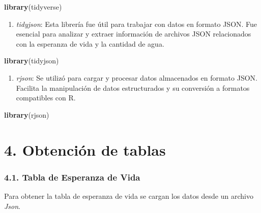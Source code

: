 \documentclass[
]{article}
\newenvironment{Shaded}{\begin{snugshade}}{\end{snugshade}}
\newcommand{\FunctionTok}[1]{\textcolor[rgb]{0.13,0.29,0.53}{\textbf{#1}}}
\newcommand{\NormalTok}[1]{#1}
\providecommand{\tightlist}{%
  \setlength{\itemsep}{0pt}\setlength{\parskip}{0pt}}
\begin{document}
\begin{Shaded}
\begin{Highlighting}[]
\FunctionTok{library}\NormalTok{(tidyverse)}
\end{Highlighting}
\end{Shaded}

\begin{enumerate}
\def\labelenumi{\arabic{enumi}.}
\setcounter{enumi}{2}
\tightlist
\item
  \emph{tidyjson}: Esta librería fue útil para trabajar con datos en
  formato JSON. Fue esencial para analizar y extraer información de
  archivos JSON relacionados con la esperanza de vida y la cantidad de
  agua.
\end{enumerate}

\begin{Shaded}
\begin{Highlighting}[]
\FunctionTok{library}\NormalTok{(tidyjson)}
\end{Highlighting}
\end{Shaded}

\begin{enumerate}
\def\labelenumi{\arabic{enumi}.}
\setcounter{enumi}{3}
\tightlist
\item
  \emph{rjson}: Se utilizó para cargar y procesar datos almacenados en
  formato JSON. Facilita la manipulación de datos estructurados y su
  conversión a formatos compatibles con R.
\end{enumerate}

\begin{Shaded}
\begin{Highlighting}[]
\FunctionTok{library}\NormalTok{(rjson) }
\end{Highlighting}
\end{Shaded}

\hypertarget{obtenciuxf3n-de-tablas}{%
\section{4. Obtención de tablas}\label{obtenciuxf3n-de-tablas}}

\hypertarget{tabla-de-esperanza-de-vida}{%
\subsubsection{4.1. Tabla de Esperanza de
Vida}\label{tabla-de-esperanza-de-vida}}

Para obtener la tabla de esperanza de vida se cargan los datos desde un
archivo \emph{Json}.
\end{document}
